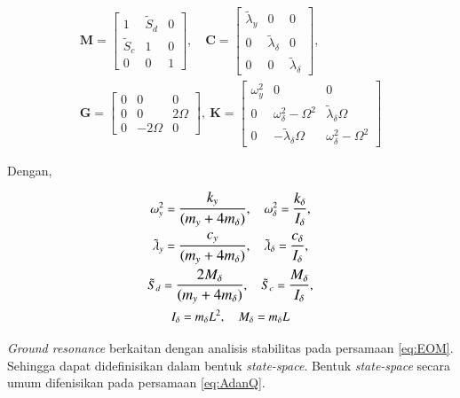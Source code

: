 \begin{equation}
\begin{gathered}
	\mathbf{M}=\begin{bmatrix}
		1& \tilde{S}_d& 0\\
		\tilde{S}_c& 1& 0\\
		0& 0& 1
	\end{bmatrix}, \quad
	\mathbf{C}=\begin{bmatrix}
		\tilde{\lambda}_y& 0& 0\\
		0& \tilde{\lambda}_{\delta}& 0\\
		0& 0& \tilde{\lambda}_{\delta} 
	\end{bmatrix}, \\
	\mathbf{G}=\begin{bmatrix}
		0& 0& 0\\
		0& 0& 2\Omega\\
		0& -2\Omega& 0
	\end{bmatrix}, \
	\mathbf{K}=\begin{bmatrix}
		\omega^2_y& 0& 0\\
		0& \omega^2_{\delta}-\Omega^2& \tilde{\lambda}_{\delta}\Omega\\
		0& -\tilde{\lambda}_{\delta}\Omega& \omega^2_{\delta}-\Omega^2
	\end{bmatrix}
\end{gathered}
\label{eq:matriks}
\end{equation}

Dengan,

\begin{equation}
	\begin{gathered}
	\omega^2_y = \mathlarger{\frac{k_y}{(m_y+4m_{\delta})}},
	\quad 
	\omega^2_{\delta} = \mathlarger{\frac{k_{\delta}}{I_{\delta}}}, 
	\\
	\tilde{\lambda}_y = \mathlarger{\frac{c_y}{(m_y+4m_{\delta})}}, 
	\quad
	\tilde{\lambda}_{\delta} = \mathlarger{\frac{c_{\delta}}{I_{\delta}}}, 
	\\ 
	\tilde{S}_d = \mathlarger{\frac{2M_{\delta}}{(m_y+4m_{\delta})}}, 
	\quad 
	\tilde{S}_c = \mathlarger{\frac{M_{\delta}}{I_{\delta}}},
	\\
	I_{\delta} = m_{\delta}L^2, \quad M_{\delta}=m_{\delta}L
	\end{gathered}
\end{equation}

\textit{Ground resonance} berkaitan dengan analisis stabilitas pada persamaan \ref{eq:EOM}. Sehingga dapat didefinisikan dalam bentuk \textit{state-space}. Bentuk \textit{state-space} secara umum difenisikan pada persamaan \ref{eq:AdanQ}.

